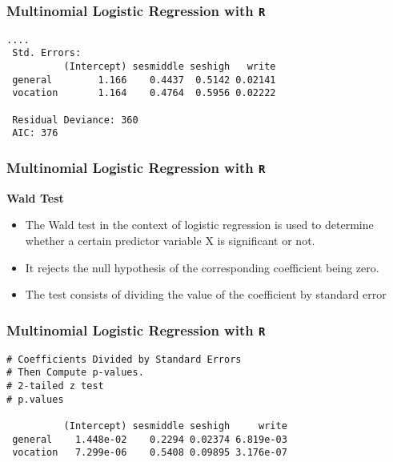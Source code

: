 \documentclass[00-GLMregslides.tex]{subfiles}
\begin{document}
\begin{frame}[fragile]

\frametitle{Multinomial Logistic Regression with \texttt{R}}
\large

\begin{verbatim}
....
 Std. Errors:
          (Intercept) sesmiddle seshigh   write
 general        1.166    0.4437  0.5142 0.02141
 vocation       1.164    0.4764  0.5956 0.02222
 
 Residual Deviance: 360 
 AIC: 376
\end{verbatim}

\end{frame}
%
% 
%
\begin{frame}
\frametitle{Multinomial Logistic Regression with \texttt{R}}
\Large
\textbf{Wald Test}

\begin{itemize}
\item The Wald test in the context of logistic regression is used to determine whether a certain predictor variable X  is significant or not. 
\item It rejects the null hypothesis of the corresponding coefficient being zero. 

\item The test consists of dividing the value of the coefficient by standard error 
\end{itemize}




\end{frame}
\begin{frame}[fragile]

\frametitle{Multinomial Logistic Regression with \texttt{R}}
\large

\begin{verbatim}
# Coefficients Divided by Standard Errors
# Then Compute p-values.
# 2-tailed z test
# p.values
 
          (Intercept) sesmiddle seshigh     write
 general    1.448e-02    0.2294 0.02374 6.819e-03
 vocation   7.299e-06    0.5408 0.09895 3.176e-07
\end{verbatim}

\end{frame}
\end{document}
